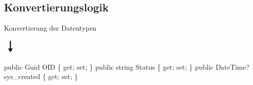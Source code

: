\documentclass[toc]{beamer}
\begin{document}
        \subsection{Konvertierungslogik}
        \begin{frame}{Konvertierung der Datentypen}
           
                \begin{table}
                    
                        
                    
                    
            \end{table}%
            \begin{center}
                \includegraphics[height=0.7cm, width=0.7cm]{pfeilUnten.png}
            \end{center}
            
                public Guid OID \{ get; set; \}\newline  
                public string Status \{ get; set; \}\newline
                public DateTime? sys\_created \{ get; set; \}\newline\newline
            
        \end{frame}
        
\end{document}
